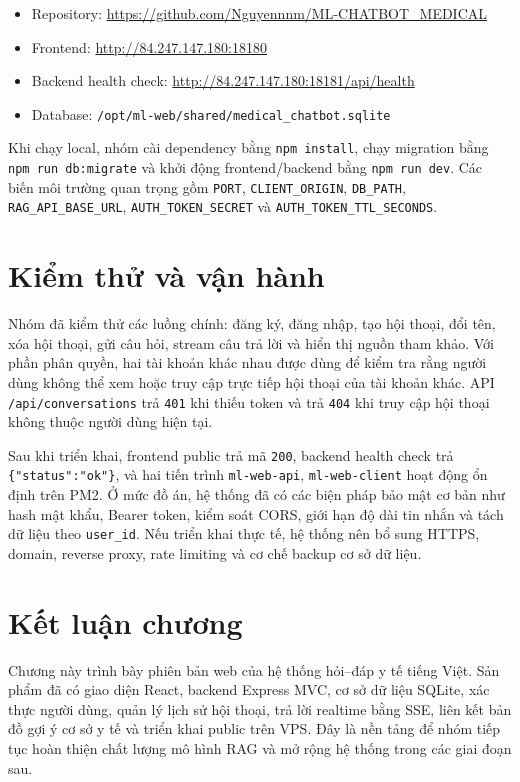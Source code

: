 \documentclass[12pt,a4paper,oneside]{report}
\begin{document}
\begin{itemize}
    \item Repository: \url{https://github.com/Nguyennnm/ML-CHATBOT_MEDICAL}
    \item Frontend: \url{http://84.247.147.180:18180}
    \item Backend health check: \url{http://84.247.147.180:18181/api/health}
    \item Database: \texttt{/opt/ml-web/shared/medical\_chatbot.sqlite}
\end{itemize}

Khi chạy local, nhóm cài dependency bằng \texttt{npm install}, chạy migration bằng \texttt{npm run db:migrate} và khởi động frontend/backend bằng \texttt{npm run dev}. Các biến môi trường quan trọng gồm \texttt{PORT}, \texttt{CLIENT\_ORIGIN}, \texttt{DB\_PATH}, \texttt{RAG\_API\_BASE\_URL}, \texttt{AUTH\_TOKEN\_SECRET} và \texttt{AUTH\_TOKEN\_TTL\_SECONDS}.

\section{Kiểm thử và vận hành}
Nhóm đã kiểm thử các luồng chính: đăng ký, đăng nhập, tạo hội thoại, đổi tên, xóa hội thoại, gửi câu hỏi, stream câu trả lời và hiển thị nguồn tham khảo. Với phần phân quyền, hai tài khoản khác nhau được dùng để kiểm tra rằng người dùng không thể xem hoặc truy cập trực tiếp hội thoại của tài khoản khác. API \texttt{/api/conversations} trả \texttt{401} khi thiếu token và trả \texttt{404} khi truy cập hội thoại không thuộc người dùng hiện tại.

Sau khi triển khai, frontend public trả mã \texttt{200}, backend health check trả \texttt{\{"status":"ok"\}}, và hai tiến trình \texttt{ml-web-api}, \texttt{ml-web-client} hoạt động ổn định trên PM2. Ở mức đồ án, hệ thống đã có các biện pháp bảo mật cơ bản như hash mật khẩu, Bearer token, kiểm soát CORS, giới hạn độ dài tin nhắn và tách dữ liệu theo \texttt{user\_id}. Nếu triển khai thực tế, hệ thống nên bổ sung HTTPS, domain, reverse proxy, rate limiting và cơ chế backup cơ sở dữ liệu.

\section{Kết luận chương}
Chương này trình bày phiên bản web của hệ thống hỏi--đáp y tế tiếng Việt. Sản phẩm đã có giao diện React, backend Express MVC, cơ sở dữ liệu SQLite, xác thực người dùng, quản lý lịch sử hội thoại, trả lời realtime bằng SSE, liên kết bản đồ gợi ý cơ sở y tế và triển khai public trên VPS. Đây là nền tảng để nhóm tiếp tục hoàn thiện chất lượng mô hình RAG và mở rộng hệ thống trong các giai đoạn sau.
\end{document}
